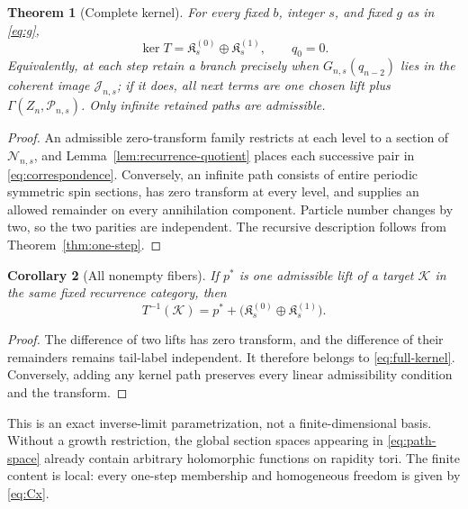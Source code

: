 \documentclass[11pt,reqno]{amsart}
\newtheorem{theorem}{Theorem}[section]
\newtheorem{corollary}[theorem]{Corollary}
\theoremstyle{definition}
\theoremstyle{remark}
\newcommand{\cK}{\mathcal K}
\newcommand{\fK}{\mathfrak K}
\begin{document}
\begin{theorem}[Complete kernel]
\label{thm:complete-kernel}
For every fixed $b$, integer $s$, and fixed $g$ as in \eqref{eq:g},
\begin{equation}
 \ker T=\fK_s^{(0)}\oplus\fK_s^{(1)},
 \qquad q_0=0.
 \label{eq:full-kernel}
\end{equation}
Equivalently, at each step retain a branch precisely when
$G_{n,s}(q_{n-2})$ lies in the coherent image $\mathscr J_{n,s}$; if it does,
all next terms are one chosen lift plus
$\Gamma(Z_n,\mathscr P_{n,s})$.  Only infinite retained paths are admissible.
\end{theorem}

\begin{proof}
An admissible zero-transform family restricts at each level to a section of
$\mathscr N_{n,s}$, and Lemma~\ref{lem:recurrence-quotient} places each
successive pair in \eqref{eq:correspondence}.  Conversely, an infinite path
consists of entire periodic symmetric spin sections, has zero transform at
every level, and supplies an allowed remainder on every annihilation
component.  Particle number changes by two, so the two parities are
independent.  The recursive description follows from
Theorem~\ref{thm:one-step}.
\end{proof}

\begin{corollary}[All nonempty fibers]
\label{cor:fiber}
If $p^*$ is one admissible lift of a target $\cK$ in the same fixed recurrence
category, then
\begin{equation}
 T^{-1}(\cK)=p^*+
 \bigl(\fK_s^{(0)}\oplus\fK_s^{(1)}\bigr).
 \label{eq:fiber}
\end{equation}
\end{corollary}

\begin{proof}
The difference of two lifts has zero transform, and the difference of their
remainders remains tail-label independent.  It therefore belongs to
\eqref{eq:full-kernel}.  Conversely, adding any kernel path preserves every
linear admissibility condition and the transform.
\end{proof}

This is an exact inverse-limit parametrization, not a finite-dimensional
basis.  Without a growth restriction, the global section spaces appearing in
\eqref{eq:path-space} already contain arbitrary holomorphic functions on
rapidity tori.  The finite content is local: every one-step membership and
homogeneous freedom is given by \eqref{eq:Cx}.
\end{document}

